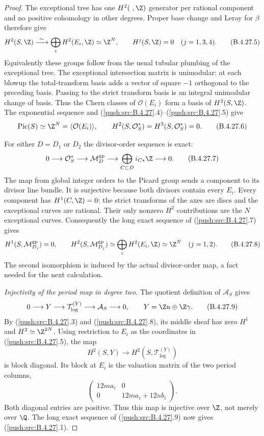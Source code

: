 \begin{proof}
The exceptional tree has one $H^2(\ ,\Z)$
generator per rational component and no positive
cohomology in other degrees. Proper base change
and Leray for $\beta$ therefore give
\[
 H^2(S,\Z)\xrightarrow{\ \sim\ }
       \bigoplus_i H^2(E_i,\Z)\simeq\Z^N,
 \qquad H^j(S,\Z)=0\quad(j=1,3,4).
 \tag{B.4.27.5}
\]
Equivalently these groups follow from the usual
tubular plumbing of the exceptional tree.
The exceptional intersection matrix is
unimodular: at each blowup the total-transform
basis adds a vector of square $-1$ orthogonal
to the preceding basis. Passing to the strict
transform basis is an integral unimodular
change of basis. Thus the Chern classes of
$\mathcal O(E_i)$ form a basis of
$H^2(S,\Z)$. The exponential sequence and
(\ref{push:src:B.4.27}.4)--(\ref{push:src:B.4.27}.5) give
\[
 \operatorname{Pic}(S)\simeq\Z^N
       =\langle\mathcal O(E_i)\rangle,
 \qquad
 H^2(S,\mathcal O_S^*)=H^3(S,\mathcal O_S^*)=0.
 \tag{B.4.27.6}
\]

For either $D=D_1$ or $D_2$ the divisor-order
sequence is exact:
\[
 0\longrightarrow\mathcal O_S^*
 \longrightarrow\mathcal M_D^{\mathrm{gp}}
 \longrightarrow
   \bigoplus_{C\subset D}i_{C*}\Z
 \longrightarrow0.
 \tag{B.4.27.7}
\]
The map from global integer orders to the Picard
group sends a component to its divisor line
bundle. It is surjective because both divisors
contain every $E_i$. Every component has
$H^1(C,\Z)=0$: the strict transforms of the
axes are discs and the exceptional curves are
rational. Their only nonzero $H^2$ contributions
are the $N$ exceptional curves. Consequently
the long exact sequence of (\ref{push:src:B.4.27}.7) gives
\[
 H^1(S,\mathcal M_{D_j}^{\mathrm{gp}})=0,
 \qquad
 H^2(S,\mathcal M_{D_j}^{\mathrm{gp}})
       \simeq\bigoplus_i H^2(E_i,\Z)
       \simeq\Z^N\quad(j=1,2).
 \tag{B.4.27.8}
\]
The second isomorphism is induced by the actual
divisor-order map, a fact needed for the next
calculation.

\emph{Injectivity of the period map in degree two.}
The quotient definition of $\mathcal A_S$ gives
\[
 0\longrightarrow Y\longrightarrow
 \mathcal T_{\log}^{(Y)}\longrightarrow
 \mathcal A_S\longrightarrow0,
 \qquad Y=\Z u\oplus\Z\gamma.
 \tag{B.4.27.9}
\]
By (\ref{push:src:B.4.27}.3) and (\ref{push:src:B.4.27}.8), its middle
sheaf has zero $H^1$ and $H^2\simeq\Z^{2N}$.
Using restriction to $E_i$ as the coordinates
in (\ref{push:src:B.4.27}.5), the map
\[
 H^2(S,Y)\longrightarrow
 H^2(S,\mathcal T_{\log}^{(Y)})
\]
is block diagonal. Its block at $E_i$ is the
valuation matrix of the two period columns,
\[
 \begin{pmatrix}
 12m a_i&0\\0&12m a_i+12n b_i
 \end{pmatrix}.
 \tag{B.4.27.10}
\]
Both diagonal entries are positive. Thus this
map is injective over $\Z$, not merely over
$\Q$. The long exact sequence of
(\ref{push:src:B.4.27}.9) now gives (\ref{push:src:B.4.27}.1).


\end{proof}
